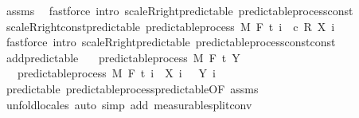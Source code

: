 \begin{isabellebody}
\endisadelimproof
%
\isatagproof
{}\isamarkupfalse%
\ assms\ \isamarkupfalse%
\ {\isacharparenleft}{\kern0pt}fastforce\ intro{\isacharcolon}{\kern0pt}\ scaleR{\isacharunderscore}{\kern0pt}right{\isacharunderscore}{\kern0pt}predictable\ predictable{\isacharunderscore}{\kern0pt}process{\isacharunderscore}{\kern0pt}const{\isacharparenright}{\kern0pt}%
\endisatagproof
{\isafoldproof}%
%
\isadelimproof
\isanewline
%
\endisadelimproof
\isanewline
{}\isamarkupfalse%
\ scaleR{\isacharunderscore}{\kern0pt}right{\isacharunderscore}{\kern0pt}const{\isacharprime}{\kern0pt}{\isacharunderscore}{\kern0pt}predictable{\isacharcolon}{\kern0pt}\ {\isachardoublequoteopen}predictable{\isacharunderscore}{\kern0pt}process\ M\ F\ t\ {\isacharparenleft}{\kern0pt}{\isasymlambda}i\ {\isasymxi}{\isachardot}{\kern0pt}\ c\ {\isacharasterisk}{\kern0pt}\isactrlsub R\ {\isacharparenleft}{\kern0pt}X\ i\ {\isasymxi}{\isacharparenright}{\kern0pt}{\isacharparenright}{\kern0pt}{\isachardoublequoteclose}\ \isanewline
%
\isadelimproof
\ \ %
\endisadelimproof
%
\isatagproof
{}\isamarkupfalse%
\ {\isacharparenleft}{\kern0pt}fastforce\ intro{\isacharcolon}{\kern0pt}\ scaleR{\isacharunderscore}{\kern0pt}right{\isacharunderscore}{\kern0pt}predictable\ predictable{\isacharunderscore}{\kern0pt}process{\isacharunderscore}{\kern0pt}const{\isacharunderscore}{\kern0pt}const{\isacharparenright}{\kern0pt}%
\endisatagproof
{\isafoldproof}%
%
\isadelimproof
\isanewline
%
\endisadelimproof
\isanewline
{}\isamarkupfalse%
\ add{\isacharunderscore}{\kern0pt}predictable{\isacharcolon}{\kern0pt}\isanewline
\ \ \ {\isachardoublequoteopen}predictable{\isacharunderscore}{\kern0pt}process\ M\ F\ t\ Y{\isachardoublequoteclose}\isanewline
\ \ \ {\isachardoublequoteopen}predictable{\isacharunderscore}{\kern0pt}process\ M\ F\ t\ {\isacharparenleft}{\kern0pt}{\isasymlambda}i\ {\isasymxi}{\isachardot}{\kern0pt}\ X\ i\ {\isasymxi}\ {\isacharplus}{\kern0pt}\ Y\ i\ {\isasymxi}{\isacharparenright}{\kern0pt}{\isachardoublequoteclose}\isanewline
%
\isadelimproof
\ \ %
\endisadelimproof
%
\isatagproof
{}\isamarkupfalse%
\ predictable\ predictable{\isacharunderscore}{\kern0pt}process{\isachardot}{\kern0pt}predictable{\isacharbrackleft}{\kern0pt}OF\ assms{\isacharbrackright}{\kern0pt}\ \isamarkupfalse%
\ {\isacharparenleft}{\kern0pt}unfold{\isacharunderscore}{\kern0pt}locales{\isacharparenright}{\kern0pt}\ {\isacharparenleft}{\kern0pt}auto\ simp\ add{\isacharcolon}{\kern0pt}\ measurable{\isacharunderscore}{\kern0pt}split{\isacharunderscore}{\kern0pt}conv{\isacharparenright}{\kern0pt}%

\end{isabellebody}
